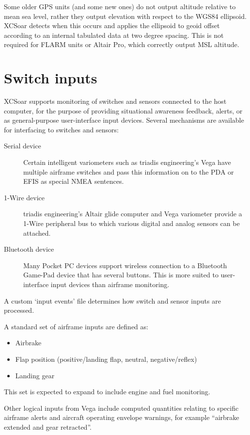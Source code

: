 Some older GPS units (and some new ones) do not output altitude
relative to mean sea level, rather they output elevation with respect
to the WGS84 ellipsoid.  XCSoar detects when this occurs and applies
the ellipsoid to geoid offset according to an internal tabulated data
at two degree spacing.  This is not required for FLARM units or Altair
Pro, which correctly output MSL altitude.

\section{Switch inputs}

XCSoar supports monitoring of switches and sensors connected to the
host computer, for the purpose of providing situational awareness
feedback, alerts, or as general-purpose user-interface input devices.
Several mechanisms are available for interfacing to switches and
sensors:
\begin{description}
\item[Serial device]  Certain intelligent variometers such as
 triadis engineering's Vega have multiple airframe switches
 and pass this information on to the PDA or EFIS as special
 NMEA sentences.
\item[1-Wire device]  triadis engineering's Altair glide computer
 and Vega variometer provide a 1-Wire peripheral bus to which
 various digital and analog sensors can be attached.
\item[Bluetooth device]  Many Pocket PC devices support wireless
 connection to a Bluetooth Game-Pad device that has several buttons.
 This is more suited to user-interface input devices than airframe
 monitoring.
\end{description}

A custom `input events' file determines how switch and sensor
inputs are processed.

A standard set of airframe inputs are defined as:
\begin{itemize}
\item Airbrake
\item Flap position (positive/landing flap, neutral, negative/reflex)
\item Landing gear
\end{itemize}

This set is expected to expand to include engine and fuel monitoring.

Other logical inputs from Vega include computed quantities relating to
specific airframe alerts and aircraft operating envelope warnings, for
example ``airbrake extended and gear retracted''.


